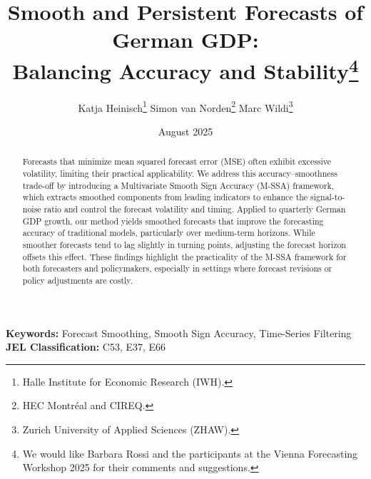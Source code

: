 \documentclass[11pt,a4paper]{article}
\begin{document}
\title{Smooth and Persistent Forecasts of German GDP:\\ Balancing Accuracy and Stability\thanks{We would like Barbara Rossi and the participants at the Vienna Forecasting Workshop 2025 for their comments and suggestions.}}
\author{Katja Heinisch\thanks{Halle Institute for Economic Research (IWH).} \hspace{0.2cm}
Simon van Norden\thanks{HEC Montréal and CIREQ.} \hspace{0.2cm}
Marc Wildi\thanks{Zurich University of Applied Sciences (ZHAW).}}
\date{August 2025} 



\maketitle
\maketitle

\begin{abstract} %
Forecasts that minimize mean squared forecast error (MSE) often exhibit excessive volatility, limiting their practical applicability. We address this accuracy–smoothness trade-off by introducing a Multivariate Smooth Sign Accuracy (M-SSA) framework, which extracts smoothed components from leading indicators to enhance the signal-to-noise ratio and control the forecast volatility and timing. Applied to quarterly German GDP growth, our method yields smoothed forecasts that improve the forecasting accuracy of traditional models, particularly over medium-term horizons. While smoother forecasts tend to lag slightly in turning points, adjusting the forecast horizon offsets this effect. These findings highlight the practicality of the M-SSA framework for both forecasters and policymakers, especially in settings where forecast revisions or policy adjustments are costly.

\end{abstract}

\bigskip \vspace{10pt}
\textbf{Keywords:} Forecast Smoothing, Smooth Sign Accuracy, Time-Series Filtering 
\newline
\textbf{JEL Classification:} C53, E37, E66
\thispagestyle{empty}
\end{document}
